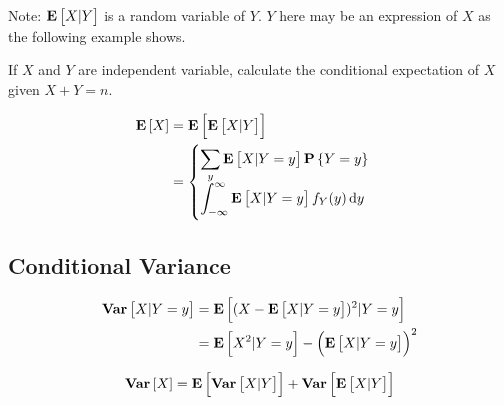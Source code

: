 Note: $\mathop{\bf E\/}\displaystyle \left[ X|Y \right]$ is a random variable of $Y$. $Y$ here may be an expression of $X$ as the following example shows.

\begin{example}
    If $X$ and $Y$ are independent variable, calculate the conditional expectation of $X$ given $X+Y=n$.
\end{example}


\begin{theorem}
    \begin{equation}
        \begin{aligned}
            \expect{X} &= \expect{ \expect{X|Y}} \\
            &= \begin{cases}
                \displaystyle \sum_y \expect{X|Y = y} \probability{Y=y} \\
                \displaystyle \int_{-\infty}^\infty \expect{X|Y=y} f_Y (y) \dif{y}
            \end{cases}
        \end{aligned}
    \end{equation}
\end{theorem}





\subsection{Conditional Variance}

\begin{theorem}
    \begin{equation}
    \begin{aligned}
        \mathop{\bf Var\/}\displaystyle \left[ X|Y=y \right] &= \mathop{\bf E\/}\displaystyle \left[ (X - \mathop{\bf E\/}\displaystyle \left[ X|Y=y \right])^2 | Y=y \right] \\
        &= \mathop{\bf E\/}\displaystyle \left[ X^2|Y=y \right]- \left(\mathop{\bf E\/}\displaystyle \left[ X|Y=y \right] \right)^2
    \end{aligned}
    \end{equation}
\end{theorem}

\begin{theorem}
 \begin{equation}
        \mathop{\bf Var\/}\displaystyle \left[ X \right] = \mathop{\bf E\/}\displaystyle \left[ \mathop{\bf Var\/}\displaystyle \left[ X|Y \right] \right] + \mathop{\bf Var\/}\displaystyle \left[ \mathop{\bf E\/}\displaystyle \left[ X|Y \right] \right]
    \end{equation}    
\end{theorem}








